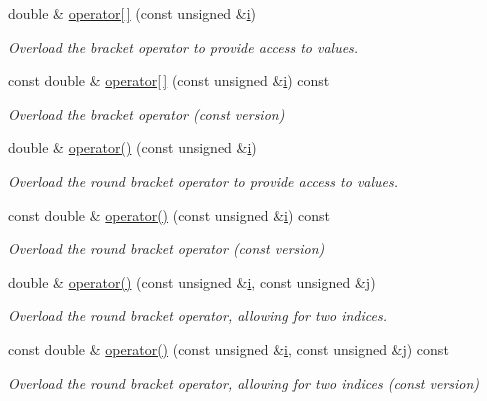 \begin{DoxyCompactItemize}
double \& \hyperlink{classoomph_1_1Shape_ad8ec7c6b2575de50c32ed7c15f38d52f}{operator\mbox{[}$\,$\mbox{]}} (const unsigned \&\hyperlink{cfortran_8h_adb50e893b86b3e55e751a42eab3cba82}{i})
\begin{DoxyCompactList}\small\item\em Overload the bracket operator to provide access to values. \end{DoxyCompactList}\item 
const double \& \hyperlink{classoomph_1_1Shape_a08939245bc26cbb5d833fbebecfc8958}{operator\mbox{[}$\,$\mbox{]}} (const unsigned \&\hyperlink{cfortran_8h_adb50e893b86b3e55e751a42eab3cba82}{i}) const
\begin{DoxyCompactList}\small\item\em Overload the bracket operator (const version) \end{DoxyCompactList}\item 
double \& \hyperlink{classoomph_1_1Shape_ab056b07f2926608b77536a15a2b3ffaf}{operator()} (const unsigned \&\hyperlink{cfortran_8h_adb50e893b86b3e55e751a42eab3cba82}{i})
\begin{DoxyCompactList}\small\item\em Overload the round bracket operator to provide access to values. \end{DoxyCompactList}\item 
const double \& \hyperlink{classoomph_1_1Shape_a317e00ba233add451d36b8208d12087b}{operator()} (const unsigned \&\hyperlink{cfortran_8h_adb50e893b86b3e55e751a42eab3cba82}{i}) const
\begin{DoxyCompactList}\small\item\em Overload the round bracket operator (const version) \end{DoxyCompactList}\item 
double \& \hyperlink{classoomph_1_1Shape_ab95188f5eed67514d5bf577bfacda57e}{operator()} (const unsigned \&\hyperlink{cfortran_8h_adb50e893b86b3e55e751a42eab3cba82}{i}, const unsigned \&j)
\begin{DoxyCompactList}\small\item\em Overload the round bracket operator, allowing for two indices. \end{DoxyCompactList}\item 
const double \& \hyperlink{classoomph_1_1Shape_aca2aaf2e793bced412831a26d3b8e8c7}{operator()} (const unsigned \&\hyperlink{cfortran_8h_adb50e893b86b3e55e751a42eab3cba82}{i}, const unsigned \&j) const
\begin{DoxyCompactList}\small\item\em Overload the round bracket operator, allowing for two indices (const version) \end{DoxyCompactList}\item 

\end{DoxyCompactItemize}
